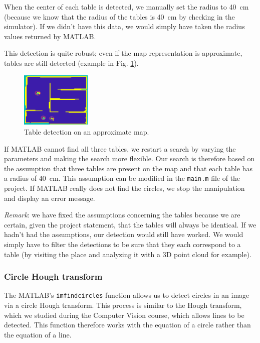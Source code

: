 \documentclass[a4paper, 10pt, conference]{ieeeconf}
\begin{document}
    When the center of each table is detected, we manually set the radius to \SI{40}{\centi\meter} (because we know that the radius of the tables is \SI{40}{\centi\meter} by checking in the simulator). If we didn't have this data, we would simply have taken the radius values returned by MATLAB.
    
    This detection is quite robust; even if the map representation is approximate, tables are still detected (example in Fig. \ref{fig:manipulation.imfindcircles}).
    
    \begin{figure}[!h]
        \centering
        \includegraphics[width=0.3\textwidth]{resources/png/imfindcircles.png}
        \caption{Table detection on an approximate map.}
        \label{fig:manipulation.imfindcircles}
    \end{figure}
    
    If MATLAB cannot find all three tables, we restart a search by varying the parameters and making the search more flexible. Our search is therefore based on the assumption that three tables are present on the map and that each table has a radius of \SI{40}{\centi\meter}. This assumption can be modified in the \texttt{main.m} file of the project. If MATLAB really does not find the circles, we stop the manipulation and display an error message.
    
    \emph{Remark}: we have fixed the assumptions concerning the tables because we are certain, given the project statement, that the tables will always be identical. If we hadn't had the assumptions, our detection would still have worked. We would simply have to filter the detections to be sure that they each correspond to a table (by visiting the place and analyzing it with a 3D point cloud for example).
    
    \subsubsection{Circle Hough transform}
    
    The MATLAB's \texttt{imfindcircles} function allows us to detect circles in an image via a circle Hough transform. This process is similar to the Hough transform, which we studied during the Computer Vision course, which allows lines to be detected. This function therefore works with the equation of a circle rather than the equation of a line.
    
\end{document}

